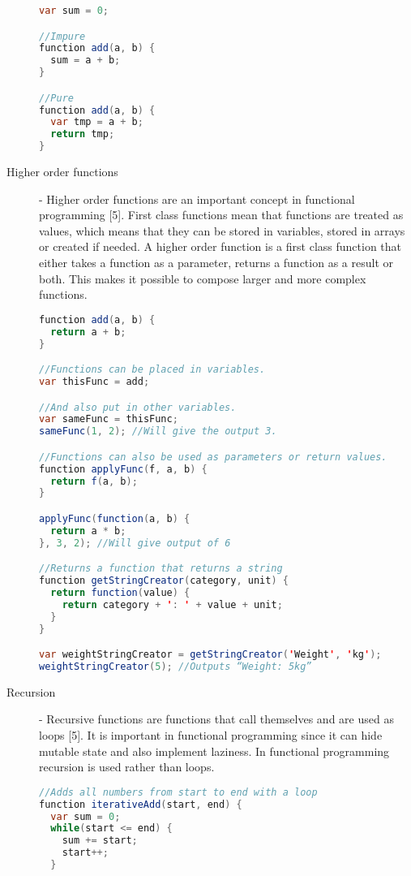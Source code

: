 \documentclass {article}
\begin{document}
\begin{description}
\begin{lstlisting}[language=Java]
var sum = 0;

//Impure
function add(a, b) {
  sum = a + b;
}

//Pure
function add(a, b) {
  var tmp = a + b;
  return tmp;
}
\end{lstlisting}

\item [Higher order functions] - Higher order functions are an important concept in functional programming [5]. First class functions mean that functions are treated as values, which means that they can be stored in variables, stored in arrays or created if needed. A higher order function is a first class function that either takes a function as a parameter, returns a function as a result or both. This makes it possible to compose larger and more complex functions.

\begin{lstlisting}[language=Java, breaklines=true]
function add(a, b) {
  return a + b;
}

//Functions can be placed in variables.
var thisFunc = add;

//And also put in other variables.
var sameFunc = thisFunc;
sameFunc(1, 2); //Will give the output 3.

//Functions can also be used as parameters or return values.
function applyFunc(f, a, b) {
  return f(a, b);
}

applyFunc(function(a, b) {
  return a * b;
}, 3, 2); //Will give output of 6

//Returns a function that returns a string
function getStringCreator(category, unit) {
  return function(value) {
    return category + ': ' + value + unit;
  }
}

var weightStringCreator = getStringCreator('Weight', 'kg');
weightStringCreator(5); //Outputs “Weight: 5kg”
\end{lstlisting}

\item [Recursion] - Recursive functions are functions that call themselves and are used as loops [5]. It is important in functional programming since it can hide mutable state and also implement laziness. In functional programming recursion is used rather than loops.

\begin{lstlisting}[language=Java]
//Adds all numbers from start to end with a loop
function iterativeAdd(start, end) {
  var sum = 0;
  while(start <= end) {
    sum += start;
    start++;
  }


\end{lstlisting}
\end{description}
\end{document}
